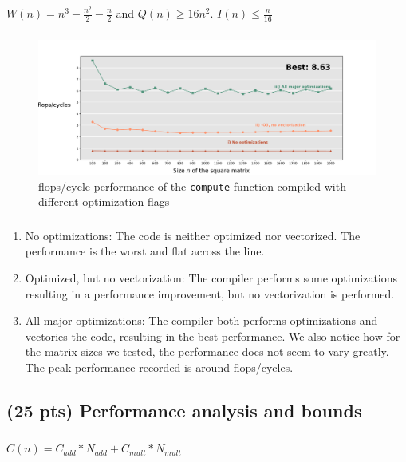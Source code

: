 \documentclass[tikz,14pt,fleqn]{article}
\begin{document}
$W(n) = n^3-\frac{n^2}{2}-\frac{n}{2}$ and $Q(n) \geq 16n^2$. $I(n) \leq \frac{n}{16}$
\subsubsection{} %
\begin{figure}[h!]
    \vspace*{-0.7cm}
    \includegraphics[width=\linewidth]{../out/ex2c.pdf}
    \caption{flops/cycle performance of the \texttt{compute} function compiled with different optimization flags}
\end{figure}


\subsubsection{} %
\begin{enumerate}
    \item No optimizations: The code is neither optimized nor vectorized. The performance is the worst and flat across the line.
    \item Optimized, but no vectorization: The compiler performs some optimizations resulting in a performance improvement, but no vectorization is performed.
    \item All major optimizations: The compiler both performs optimizations and vectories the code, resulting in the best performance. We also notice how for the matrix sizes we tested, the performance does not seem to vary greatly. The peak performance recorded is around  flops/cycles.
\end{enumerate}

\subsection{(25 pts) Performance analysis and bounds}
\subsubsection{} %
$C(n) = C_{add}*N_{add} + C_{mult}*N_{mult}$
\end{document}
